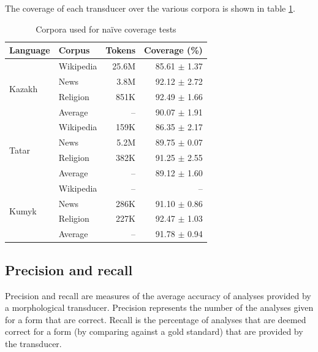 \documentclass[a4paper,11pt,twocolumn]{article}
\begin{document}

The coverage of each transducer over the various corpora is shown in table \ref{table:corpora}.

\begin{table}
\begin{center}
\begin{tabular}{llrr}
\toprule
\textbf{Language} & \textbf{Corpus} & \textbf{Tokens} & \textbf{Coverage} (\%) \\
\midrule
\multirow{4}{*}{Kazakh} & Wikipedia & 25.6M & 85.61 $\pm$ 1.37 \\
	& News & 3.8M & 92.12 $\pm$ 2.72  \\
	& Religion & 851K & 92.49 $\pm$ 1.66 \\\cline{2-4}
	& Average & -- & 90.07 $\pm$ 1.91 \\
\midrule
\multirow{4}{*}{Tatar} & Wikipedia & 159K & 86.35 $\pm$ 2.17 \\
	& News & 5.2M & 89.75 $\pm$ 0.07 \\
	& Religion & 382K & 91.25 $\pm$ 2.55 \\\cline{2-4}
	& Average & -- & 89.12 $\pm$ 1.60 \\
\midrule
\multirow{4}{*}{Kumyk} & Wikipedia & -- & -- \\
        & News & 286K &  91.10 $\pm$ 0.86 \\
	& Religion & 227K & 92.47 $\pm$ 1.03 \\\cline{2-4}
	& Average & -- & 91.78 $\pm$ 0.94 \\
\bottomrule
\end{tabular}
 \caption{Corpora used for naïve coverage tests}
 \label{table:corpora}
\end{center}
\end{table}

\subsection{Precision and recall}

Precision and recall are measures of the average accuracy of analyses provided by a morphological transducer.  Precision represents the number of the analyses given for a form that are correct.  Recall is the percentage of analyses that are deemed correct for a form (by comparing against a gold standard) that are provided by the transducer.
\end{document}
